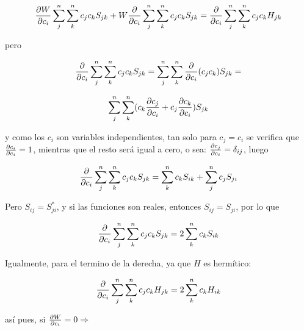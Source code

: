 \documentclass[a4paper,openright,12pt, oneside]{book}
\begin{document}
\begin{displaymath}{
    {\partial W \over \partial c_{i}} \sum^{n}_{j} \sum^{n}_{k} c_j c_k S_{jk} + W {\partial \over \partial c_{i}}}
\sum^{n}_{j} \sum^{n}_{k} c_{j} c_{k} S_{jk} =  {{ \partial \over \partial c_i} \sum^{n}_{j} \sum^{n}_{k} c_{j} c_{k} H_{jk}}
\end{displaymath}


pero

\begin{displaymath}
{\partial \over \partial c_{i}} \sum^{n}_{j} \sum^{n}_{k} c_{j} c_{k}
S_{jk} = \sum^{n}_{j} \sum^{n}_{k} {\partial \over \partial c_{i}}
(c_{j} c_{k}) S_{jk} =
\end{displaymath}

\begin{displaymath}
\sum^{n}_{j} \sum^{n}_{k} (c_{k}{\partial c_j\over \partial c_{i}}
+ c_{j} {\partial c_k\over \partial c_{i}} ) S_{jk}
\end{displaymath}


y como los $c_{i}$ son variables independientes, tan solo para $c_{j}=c_{i}$ se verifica que  ${\partial c_i\over \partial c_i} =
1$, mientras que el resto ser\'a igual a cero, o sea:  ${\partial
c_j\over \partial c_i} = \delta _{ij}$, luego

 \begin{displaymath}
{\partial \over \partial c_{i}} \sum^{n}_{j} \sum^{n}_{k} c_{j} c_{k}
S_{jk} = \sum^{n}_{k} c_{k} S_{ik} + \sum^{n}_{j} c_{j} S_{ji}
\end{displaymath}



Pero  $S_{ij} = S^{*}_{ji}$, y si las funciones son reales, entonces $S_{ij}=S_{ji}$, por lo que

\begin{displaymath}{\partial \over \partial c_{i}} \sum^{n}_{j} \sum^{n}_{k} c_{j} c_{k}
S_{jk} = 2 \sum^{n}_{k} c_{k} S_{ik} \end{displaymath}

Igualmente, para el termino de la derecha, ya que $H$ es herm\'itico:


\begin{displaymath}{\partial \over \partial c_{i}} \sum^{n}_{j} \sum^{n}_{k} c_{j} c_{k}
H_{jk} = 2 \sum^{n}_{k} c_{k} H_{ik} \end{displaymath}

as\'i pues, si         ${\partial W\over \partial c_{i}} = 0 \Rightarrow
$
\end{document}
